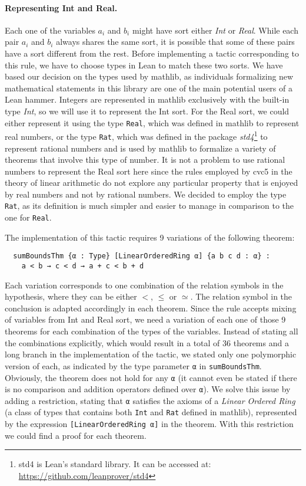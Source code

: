\paragraph{Representing Int and Real.} Each one of the variables $a_{i}$ and $b_{i}$ might
have sort either \textit{Int} or \textit{Real}.
While each pair $a_{i}$ and $b_{i}$ always shares the same sort, it is possible that some of these pairs have a sort different from the rest. Before implementing a
tactic corresponding to this rule, we have to choose types in Lean to match
these two sorts. We have based our decision on the types used by mathlib, as
individuals formalizing new mathematical statements in this library are one of the main potential users
of a Lean hammer. Integers are represented in mathlib exclusively with the built-in type \textit{Int}, so we will use it to represent the Int sort.
For the Real sort, we could either represent it using the type \texttt{Real}, which was defined in mathlib
to represent real numbers, or the type \texttt{Rat}, which was defined in the package \textit{std4}\footnote{std4 is Lean's standard library. It can be accessed at: \url{https://github.com/leanprover/std4}} to
represent rational numbers and is used by mathlib to formalize a variety of theorems
that involve this type of number.
It is not a problem to use rational numbers to represent the Real sort here since the rules employed by cvc5 in the theory of linear arithmetic
do not explore any particular property that is enjoyed by real numbers and not by
rational numbers.
We decided to employ the type \texttt{Rat}, as its definition is much simpler and easier
to manage in comparison to the one for \texttt{Real}.

The implementation of this tactic requires 9 variations of the following theorem:

\begin{verbatim}
  sumBoundsThm {α : Type} [LinearOrderedRing α] {a b c d : α} :
    a < b → c < d → a + c < b + d
\end{verbatim}

Each variation corresponds to one combination of the relation symbols in the hypothesis, where
they can be either $<$, $\le$ or $\simeq$. The relation symbol in the
conclusion is adapted accordingly in each theorem. Since the rule accepts mixing of variables
from Int and Real sort, we need a variation of each one of those 9 theorems for each combination
of the types of the variables. Instead of stating all the combinations explicitly, which would
result in a total of 36 theorems and a long branch in the implementation of the tactic,
we stated only one polymorphic version of each, as indicated by the type parameter \texttt{α} in \texttt{sumBoundsThm}.
Obviously, the theorem does not hold
for any \texttt{α} (it cannot even be stated if there is no comparison and addition operators defined over \texttt{α}).
We solve this issue by adding a restriction, stating that \texttt{α} satisfies the axioms of a
\textit{Linear Ordered Ring} (a class of types that contains both \texttt{Int} and \texttt{Rat} defined in mathlib), represented by the expression \texttt{[LinearOrderedRing α]} in the theorem. With this restriction we
could find a proof for each theorem.

